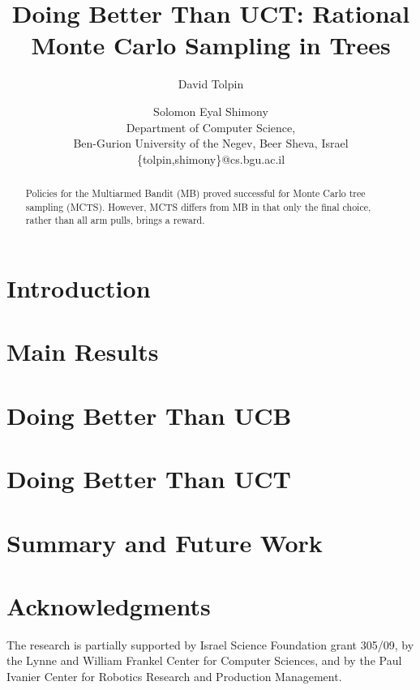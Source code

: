 \documentclass{article}
\title{Doing Better Than UCT: Rational Monte Carlo Sampling in Trees}
\author {David Tolpin \and Solomon Eyal Shimony \\
Department of Computer Science, \\
Ben-Gurion University of the Negev, Beer Sheva, Israel \\
\{tolpin,shimony\}@cs.bgu.ac.il}
\begin{document}
\maketitle

\begin{abstract}

Policies for the Multiarmed Bandit (MB) proved successful for Monte Carlo
tree sampling (MCTS). However, MCTS differs from MB in that only the
final choice, rather than all arm pulls, brings a reward. 

\end{abstract}


\section{Introduction}

\cite{Auer.ucb}

\section{Main Results}

\section{Doing Better Than UCB}

\section{Doing Better Than UCT}

\section{Summary and Future Work}

\section*{Acknowledgments}

The research is partially supported by Israel
Science Foundation grant 305/09, by the Lynne and William Frankel
Center for Computer Sciences, and by the Paul Ivanier Center for
Robotics Research and Production Management.



\end{document}
